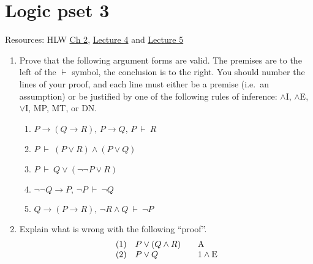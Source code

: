 \documentclass[fleqn,12pt]{article}
\begin{document}
\thispagestyle{empty}

\section*{Logic pset 3}

Resources: HLW \href{https://www.jstor.org/stable/j.ctvxrpz0q.5}{Ch
  2}, \href{https://princeton.hosted.panopto.com/Panopto/Pages/Viewer.aspx?id=bab527ef-2604-4956-af35-acbd0180a259}{Lecture 4} and \href{https://princeton.hosted.panopto.com/Panopto/Pages/Viewer.aspx?id=85dd66c8-78cd-4799-b131-acbe01605214}{Lecture 5}

\begin{enumerate}
\item Prove that the following argument forms are valid.  The premises
  are to the left of the $\vdash$ symbol, the conclusion is to the
  right.  You should number the lines of your proof, and each line
  must either be a premise (i.e.\ an assumption) or be justified by
  one of the following rules of inference: $\wedge$I, $\wedge$E,
  $\vee$I, MP, MT, or DN.
\begin{enumerate}
\item $P\to (Q\to R),\,P\to Q,\,P\:\vdash\: R$
\item $P\:\vdash\: (P\vee R)\wedge (P\vee Q)$
\item $P\:\vdash\: Q\vee (\neg\neg P\vee R)$  
\item $\neg\neg Q\to P,\,\neg P\:\vdash\:\neg Q$
\item $Q\to (P\to R),\,\neg R\wedge Q\:\vdash\: \neg P$
\end{enumerate} \bigskip 

\item Explain what is wrong with the following ``proof''.
\[ \begin{array}{c l l l}
     (1) & P\vee (Q\wedge R) & & \text{A}   \\
     (2) & P\vee Q & & 1 \wedge\text{E} \end{array} \] 
\end{enumerate}     
\end{document}
